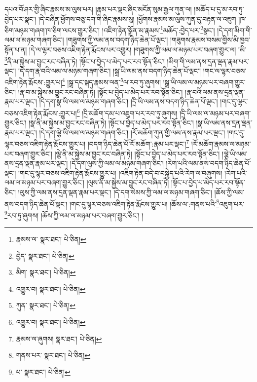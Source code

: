 དཔའ་བོ་ཤར་གྱི་ཞིང་རྣམས་མ་ལུས་པར། །རྣམ་པར་ལྡང་ཞིང་མངོན་སུམ་རྒྱལ་ཀུན་ལ། །མཆོད་པ་དུ་མ་རབ་ཏུ་བྱེད་པར་སྣང་། །དེ་བཞིན་ཕྱོགས་བཅུ་དག་གི་ཞིང་རྣམས་སུ། །ཕྱོགས་རྣམས་མ་ལུས་ཀུན་དུ་བརྟན་ལ་འཇུག །ཁ་ཅིག་མཉམ་གཞག་ཁ་ཅིག་ལངས་གྱུར་ཅིང་། །འཇིག་རྟེན་སྒྲོན་མ་རྣམས་\footnote{རྣམས་ལ་  སྣར་ཐང་།  པེ་ཅིན། }མཆོད་:བྱེད་པར་\footnote{བྱེད་  སྣར་ཐང་།  པེ་ཅིན། }སྣང་། །དེ་དག་མིག་གི་ལམ་ལ་མཉམ་གཞག་ཅིང་། །གཟུགས་ཀྱི་ལམ་ནས་བདག་ཉིད་ཆེན་པོ་ལྡང་། །གཟུགས་རྣམས་བསམ་གྱིས་མི་ཁྱབ་སྟོན་པ་ན། །དེ་ལ་ལྷར་བཅས་འཇིག་རྟེན་རྨོངས་པར་འགྱུར། །གཟུགས་ཀྱི་ལམ་ལ་མཉམ་པར་བཞག་གྱུར་ལ། །མི་\footnote{མིག་  སྣར་ཐང་།  པེ་ཅིན། }ནི་མ་སྐྱེས་མ་བྱུང་རང་བཞིན་ཏེ། །སྟོང་པ་བྱེད་པ་མེད་པར་རབ་སྟོན་ཅིང་། །མིག་གི་ལམ་ནས་དྲན་ལྡན་རྣམ་པར་ལྡང་། །དེ་དག་རྣ་བའི་ལམ་ལ་མཉམ་གཞག་ཅིང་། །སྒྲ་ཡི་ལམ་ནས་བདག་ཉིད་ཆེན་པོ་ལྡང་། །གང་ལ་ལྷར་བཅས་འཇིག་རྟེན་རྨོངས་:གྱུར་པ།\footnote{འགྱུར་བ།  སྣར་ཐང་།  པེ་ཅིན། } །སྒྲ་དང་སྐད་རྣམས་ལན་\footnote{ཀུན་  སྣར་ཐང་།  པེ་ཅིན། }ལ་རབ་ཏུ་ཞུགས། །སྒྲ་ཡི་ལམ་ལ་མཉམ་པར་བཞག་གྱུར་ཅིང་། །རྣ་བ་མ་སྐྱེས་མ་བྱུང་རང་བཞིན་ཏེ། །སྟོང་པ་བྱེད་པ་མེད་པར་རབ་སྟོན་ཅིང་། །རྣ་བའི་ལམ་ནས་དྲན་ལྡན་རྣམ་པར་ལྡང་། །དེ་དག་སྣ་ཡི་ལམ་ལ་མཉམ་གཞག་ཅིང་། །དྲི་ཡི་ལམ་ནས་བདག་ཉིད་ཆེན་པོ་ལྡང་། །གང་དུ་ལྷར་བཅས་འཇིག་རྟེན་རྨོངས་:གྱུར་པ།\footnote{འགྱུར་བ།  སྣར་ཐང་།  པེ་ཅིན། } །དྲི་མཆོག་དམ་པ་འཇུག་པར་རབ་ཏུ་ཞུགས། །དྲི་ཡི་ལམ་ལ་མཉམ་པར་བཞག་གྱུར་ཅིང་། །སྣ་ནི་མ་སྐྱེས་མ་བྱུང་རང་བཞིན་ཏེ། །སྟོང་པ་བྱེད་པ་མེད་པར་རབ་སྟོན་ཅིང་། །སྣ་ཡི་ལམ་ནས་དྲན་ལྡན་རྣམ་པར་ལྡང་། །དེ་དག་ལྕེ་ཡི་ལམ་ལ་མཉམ་གཞག་ཅིང་། །རོ་མཆོག་ཀུན་གྱི་ལམ་ནས་རྣམ་པར་ལྡང་། །གང་དུ་ལྷར་བཅས་འཇིག་རྟེན་རྨོངས་གྱུར་པ། །བདག་ཉིད་ཆེན་པོ་རོ་མཆོག་:རྣམ་པར་ལྡང་།\footnote{རྣམས་ལ་ཞུགས།  སྣར་ཐང་།  པེ་ཅིན། } །རོ་མཆོག་རྣམས་ལ་མཉམ་པར་བཞག་གྱུར་ཅིང་། །ལྕེ་ནི་མ་སྐྱེས་མ་བྱུང་རང་བཞིན་ཏེ། །སྟོང་པ་བྱེད་པ་མེད་པར་རབ་སྟོན་ཅིང་། །ལྕེ་ཡི་ལམ་ནས་དྲན་ལྡན་རྣམ་པར་ལྡང་། །དེ་དག་ལུས་ཀྱི་ལམ་ལ་མཉམ་གཞག་ཅིང་། །རེག་པའི་ལམ་ནས་བདག་ཉིད་ཆེན་པོ་ལྡང་། །གང་དུ་ལྷར་བཅས་འཇིག་རྟེན་རྨོངས་གྱུར་པ། །འཇིག་རྟེན་བདེ་བ་བསྐྱེད་པའི་རེག་ལ་བཞུགས། །རེག་པའི་ལམ་ལ་མཉམ་པར་བཞག་གྱུར་ཅིང་། །ལུས་ནི་མ་སྐྱེས་མ་བྱུང་རང་བཞིན་ཏེ། །སྟོང་པ་བྱེད་པ་མེད་པར་རབ་སྟོན་ཅིང་། །ལུས་ཀྱི་ལམ་ནས་དྲན་ལྡན་རྣམ་པར་ལྡང་། །དེ་དག་སེམས་ཀྱི་ལམ་ལ་མཉམ་གཞག་ཅིང་། །ཆོས་ཀྱི་ལམ་ནས་བདག་ཉིད་ཆེན་པོ་ལྡང་། །གང་དུ་ལྷར་བཅས་འཇིག་རྟེན་རྨོངས་གྱུར་པ། །ཆོས་ལ་:གནས་པའི་\footnote{གནས་པར་  སྣར་ཐང་།  པེ་ཅིན། }འཇུག་པར་\footnote{པ་  སྣར་ཐང་།  པེ་ཅིན། }རབ་ཏུ་ཞུགས། །ཆོས་ཀྱི་ལམ་ལ་མཉམ་པར་བཞག་གྱུར་ཅིང་། །
